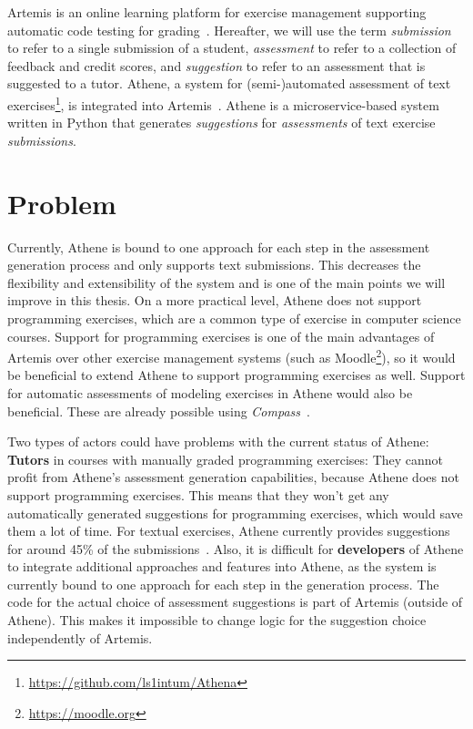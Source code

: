 Artemis is an online learning platform for exercise management supporting automatic code testing for grading~\cite{ArTEMiS}.
%
Hereafter, we will use the term \textit{submission} to refer to a single submission of a student, \textit{assessment} to refer to a collection of feedback and credit scores, and \textit{suggestion} to refer to an assessment that is suggested to a tutor.
Athene, a system for (semi-)automated assessment of text exercises\footnote{\url{https://github.com/ls1intum/Athena}}, is integrated into Artemis~\cite{cofee}. Athene is a microservice-based system written in Python that generates \textit{suggestions} for \textit{assessments} of text exercise \textit{submissions}.


\section{Problem}

Currently, Athene is bound to one approach for each step in the assessment generation process and only supports text submissions. This decreases the flexibility and extensibility of the system and is one of the main points we will improve in this thesis.
On a more practical level, Athene does not support programming exercises, which are a common type of exercise in computer science courses. Support for programming exercises is one of the main advantages of Artemis over other exercise management systems (such as Moodle\footnote{\url{https://moodle.org}}), so it would be beneficial to extend Athene to support programming exercises as well.
Support for automatic assessments of modeling exercises in Athene would also be beneficial. These are already possible using \textit{Compass}~\cite{compass}.

Two types of actors could have problems with the current status of Athene:
\textbf{Tutors} in courses with manually graded programming exercises: They cannot profit from Athene's assessment generation capabilities, because Athene does not support programming exercises. This means that they won't get any automatically generated suggestions for programming exercises, which would save them a lot of time.
For textual exercises, Athene currently provides suggestions for around 45\% of the submissions~\cite{cofee2}.
Also, it is difficult for \textbf{developers} of Athene to integrate additional approaches and features into Athene, as the system is currently bound to one approach for each step in the generation process. 
The code for the actual choice of assessment suggestions is part of Artemis (outside of Athene). This makes it impossible to change logic for the suggestion choice independently of Artemis.

